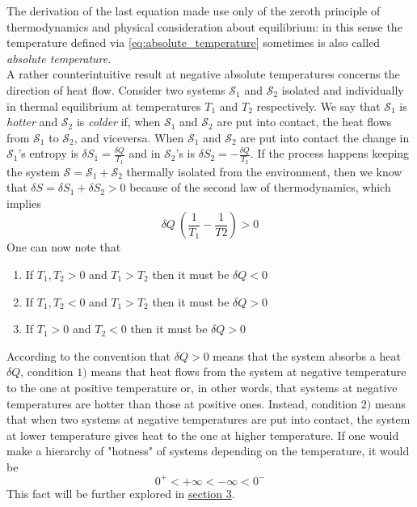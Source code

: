 The derivation of the last equation made use only of the zeroth principle of thermodynamics and physical consideration about equilibrium: in this sense the temperature defined via \ref{eq:absolute_temperature} sometimes is also called \emph{absolute temperature}. \\
A rather counterintuitive result at negative absolute temperatures concerns the direction of heat flow. Consider two systems $\mathcal{S}_1$ and $\mathcal{S}_2$ isolated and individually in thermal equilibrium at temperatures $T_1$ and $T_2$ respectively. We say that $\mathcal{S}_1$ is \textit{hotter} and $\mathcal{S}_2$ is \textit{colder} if, when 
$\mathcal{S}_1$ and $\mathcal{S}_2$ are put into contact, the heat flows from $\mathcal{S}_1$ to $\mathcal{S}_2$, and viceversa. When $\mathcal{S}_1$ and $\mathcal{S}_2$ are put into contact the change in $\mathcal{S}_1$'s entropy is $\delta S_1 = \frac{\delta Q}{T_1}$ and in $\mathcal{S}_2$'s is $\delta S_2 = -\frac{\delta Q}{T_2}$. If the process happens keeping 
the system $\mathcal{S} = \mathcal{S}_1 + \mathcal{S}_2$ thermally isolated from the environment, then we know that $\delta S = \delta S_1 + \delta S_2 > 0$ because of the second law of thermodynamics, which implies 
\begin{equation*}
    \delta Q \ \left(\frac{1}{T_1} - \frac{1}{T2}\right) > 0
\end{equation*}
One can now note that
\begin{enumerate}
    \item If $T_1, T_2 > 0$ and $T_1 > T_2$ then it must be $\delta Q < 0$
    \item If $T_1, T_2 < 0$ and $T_1 > T_2$ then it must be $\delta Q > 0$
    \item If $T_1 > 0$ and $T_2 < 0$ then it must be $\delta Q > 0$
\end{enumerate}
According to the convention that $\delta Q > 0$ means that the system absorbs a heat $\delta Q$, condition $1)$ means that heat flows from the system at negative temperature to the one at positive temperature or, in other words, that
systems at negative temperatures are hotter than those at positive ones. Instead, condition $2)$ means that when two systems at negative temperatures are put into contact, the system at lower temperature gives heat to the one at higher temperature. If one would make
a hierarchy of "hotness" of systems depending on the temperature, it would be 
\begin{equation*}
    0^+ < +\infty < -\infty < 0^-
\end{equation*}
This fact will be further explored in \hyperref[sec:TLS]{section 3}.

